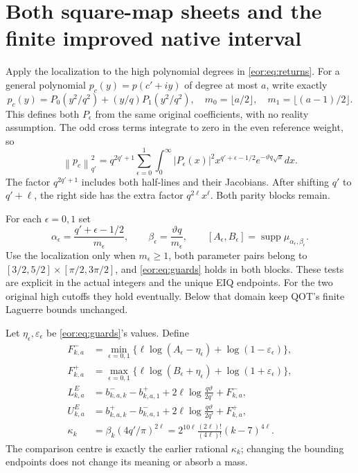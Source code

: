 \documentclass[11pt,a4paper]{article}
\newcommand{\norm}[1]{\left\lVert#1\right\rVert}
\begin{document}
\section{Both square-map sheets and the finite improved native interval}
\label{eor:sec:application}
Apply the localization to the high polynomial degrees in \eqref{eor:eq:returns}.
For a general polynomial $p_c(y)=p(c'+iy)$ of degree at most $a$, write exactly
\begin{equation}
 p_c(y)=P_0(y^2/q^2)+(y/q)P_1(y^2/q^2),\quad
 m_0=\lfloor a/2\rfloor,\quad m_1=\lfloor(a-1)/2\rfloor .
 \label{eor:eq:parity}
\end{equation}
This defines both $P_\epsilon$ from the same original coefficients, with no
reality assumption. The odd cross terms integrate to zero in the even reference
weight, so
\begin{equation}
 \norm{p_c}_{q'}^2=q^{2q'+1}\sum_{\epsilon=0}^1
 \int_0^\infty |P_\epsilon(x)|^2
 x^{q'+\epsilon-1/2}e^{-\vartheta q\sqrt x}dx.
 \label{eor:eq:square}
\end{equation}
The factor $q^{2q'+1}$ includes both half-lines and their Jacobians.
After shifting $q'$ to $q'+\ell$, the right side has the extra factor
$q^{2\ell}x^\ell$. Both parity blocks remain.

For each $\epsilon=0,1$ set
\begin{equation}
 \alpha_\epsilon=\frac{q'+\epsilon-1/2}{m_\epsilon},\qquad
 \beta_\epsilon=\frac{\vartheta q}{m_\epsilon},\qquad
 [A_\epsilon,B_\epsilon]=\operatorname{supp}\mu_{\alpha_\epsilon,\beta_\epsilon}.
 \label{eor:eq:parameters}
\end{equation}
Use the localization only when $m_\epsilon\ge1$, both parameter pairs belong to
$[3/2,5/2]\times[\pi/2,3\pi/2]$, and \eqref{eor:eq:guards} holds in both blocks.
These tests are explicit in the actual integers and the unique EIQ endpoints.
For the two original high cutoffs they hold eventually. Below that domain keep
QOT's finite Laguerre bounds unchanged.

Let $\eta_\epsilon,\varepsilon_\epsilon$ be \eqref{eor:eq:guards}'s values. Define
\begin{equation}
\begin{split}
 F_{k,a}^{-}&=\min_{\epsilon=0,1}
  \{\ell\log(A_\epsilon-\eta_\epsilon)+\log(1-\varepsilon_\epsilon)\},\\
 F_{k,a}^{+}&=\max_{\epsilon=0,1}
  \{\ell\log(B_\epsilon+\eta_\epsilon)+\log(1+\varepsilon_\epsilon)\},\\
 L_{k,a}^{E}&=b_{k,a,k}^{-}-b_{k,a,1}^{+}
       +2\ell\log\frac{q\vartheta}{2q'}+F_{k,a}^{-},\\
 U_{k,a}^{E}&=b_{k,a,k}^{+}-b_{k,a,1}^{-}
       +2\ell\log\frac{q\vartheta}{2q'}+F_{k,a}^{+},\\
 \kappa_k&=\beta_k(4q'/\pi)^{2\ell}
          =2^{10\ell}\frac{(2\ell)!}{(4\ell)!}(k-7)^{4\ell}.
\end{split}\label{eor:eq:newconstants}
\end{equation}
The comparison centre is exactly the earlier rational $\kappa_k$; changing the
bounding endpoints does not change its meaning or absorb a mass.
\end{document}
